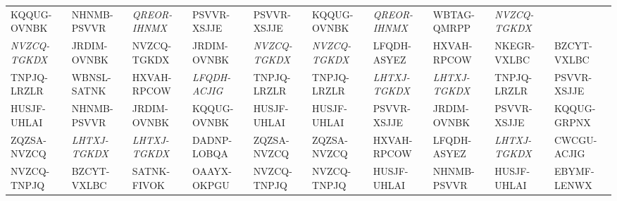 \begin{table}[]
{\begin{tabular}{@{}|l|l|l|l|l|l|l|l|l|l|@{}}
  {\color[HTML]{000000} KQQUG-OVNBK} &
  {\color[HTML]{000000} NHNMB-PSVVR} &
  {\color[HTML]{CB0000} \textit{QREOR-IHNMX}} &
  {\color[HTML]{000000} PSVVR-XSJJE} &
  {\color[HTML]{000000} PSVVR-XSJJE} &
  {\color[HTML]{000000} KQQUG-OVNBK} &
  {\color[HTML]{CB0000} \textit{QREOR-IHNMX}} &
  {\color[HTML]{000000} WBTAG-QMRPP} &
  {\color[HTML]{009901} \textit{NVZCQ-TGKDX}} \\
{\color[HTML]{009901} \textit{NVZCQ-TGKDX}} &
  {\color[HTML]{000000} JRDIM-OVNBK} &
  {\color[HTML]{009901} NVZCQ-TGKDX} &
  {\color[HTML]{000000} JRDIM-OVNBK} &
  {\color[HTML]{009901} \textit{NVZCQ-TGKDX}} &
  {\color[HTML]{009901} \textit{NVZCQ-TGKDX}} &
  {\color[HTML]{000000} LFQDH-ASYEZ} &
  {\color[HTML]{000000} HXVAH-RPCOW} &
  {\color[HTML]{000000} NKEGR-VXLBC} &
  {\color[HTML]{000000} BZCYT-VXLBC} \\
{\color[HTML]{000000} TNPJQ-LRZLR} &
  {\color[HTML]{000000} WBNSL-SATNK} &
  {\color[HTML]{000000} HXVAH-RPCOW} &
  {\color[HTML]{986536} \textit{LFQDH-ACJIG}} &
  {\color[HTML]{000000} TNPJQ-LRZLR} &
  {\color[HTML]{000000} TNPJQ-LRZLR} &
  {\color[HTML]{3531FF} \textit{LHTXJ-TGKDX}} &
  {\color[HTML]{3531FF} \textit{LHTXJ-TGKDX}} &
  {\color[HTML]{000000} TNPJQ-LRZLR} &
  {\color[HTML]{000000} PSVVR-XSJJE} \\
{\color[HTML]{000000} HUSJF-UHLAI} &
  {\color[HTML]{000000} NHNMB-PSVVR} &
  {\color[HTML]{000000} JRDIM-OVNBK} &
  {\color[HTML]{000000} KQQUG-OVNBK} &
  {\color[HTML]{000000} HUSJF-UHLAI} &
  {\color[HTML]{000000} HUSJF-UHLAI} &
  {\color[HTML]{000000} PSVVR-XSJJE} &
  {\color[HTML]{000000} JRDIM-OVNBK} &
  {\color[HTML]{000000} PSVVR-XSJJE} &
  {\color[HTML]{000000} KQQUG-GRPNX} \\
{\color[HTML]{000000} ZQZSA-NVZCQ} &
  {\color[HTML]{3531FF} \textit{LHTXJ-TGKDX}} &
  {\color[HTML]{3531FF} \textit{LHTXJ-TGKDX}} &
  {\color[HTML]{000000} DADNP-LOBQA} &
  {\color[HTML]{000000} ZQZSA-NVZCQ} &
  {\color[HTML]{000000} ZQZSA-NVZCQ} &
  {\color[HTML]{000000} HXVAH-RPCOW} &
  {\color[HTML]{000000} LFQDH-ASYEZ} &
  {\color[HTML]{3531FF} \textit{LHTXJ-TGKDX}} &
  {\color[HTML]{000000} CWCGU-ACJIG} \\
{\color[HTML]{000000} NVZCQ-TNPJQ} &
  {\color[HTML]{000000} BZCYT-VXLBC} &
  {\color[HTML]{000000} SATNK-FIVOK} &
  {\color[HTML]{000000} OAAYX-OKPGU} &
  {\color[HTML]{000000} NVZCQ-TNPJQ} &
  {\color[HTML]{000000} NVZCQ-TNPJQ} &
  {\color[HTML]{000000} HUSJF-UHLAI} &
  {\color[HTML]{000000} NHNMB-PSVVR} &
  {\color[HTML]{000000} HUSJF-UHLAI} &
  {\color[HTML]{000000} EBYMF-LENWX} \\ \midrule
\end{tabular}
}
\label{tab:top-10-sim-pairs}
\end{table}


